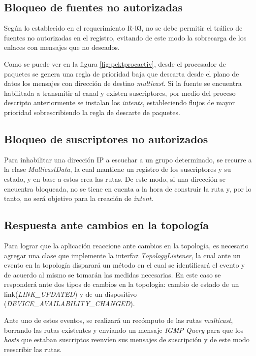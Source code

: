 \subsection{Bloqueo de fuentes no autorizadas}

Según lo establecido en el requerimiento R-03, no se debe permitir el tráfico de fuentes no autorizadas en el registro, evitando de este modo la sobrecarga de los enlaces con mensajes que no deseados. \

Como se puede ver en la figura \ref{fig:pcktprocactiv}, desde el procesador de paquetes se genera una regla de prioridad baja que descarta desde el plano de datos los mensajes con dirección de destino \textit{multicast}. Si la fuente se encuentra habilitada a transmitir al canal y existen suscriptores, por medio del proceso descripto anteriormente se instalan los \textit{intents}, estableciendo flujos de mayor prioridad sobrescribiendo la regla de descarte de paquetes. \

\subsection{Bloqueo de suscriptores no autorizados}

Para inhabilitar una dirección IP a escuchar a un grupo determinado, se recurre a la clase \textit{MulticastData}, la cual mantiene un registro de los suscriptores y su estado, y en base a estos crea las rutas. De este modo, si una dirección se encuentra bloqueada, no se tiene en cuenta a la hora de construir la ruta y, por lo tanto, no será objetivo para la creación de \textit{intent}.

\subsection{Respuesta ante cambios en la topología}

Para lograr que la aplicación reaccione ante cambios en la topología, es necesario agregar una clase que implemente la interfaz \textit{TopologyListener}, la cual ante un evento en la topología disparará un método en el cual se identificará el evento y de acuerdo al mismo se tomarán las medidas necesarias. En este caso se responderá ante dos tipos de cambios en la topología: cambio de estado de un link(\textit{LINK\_UPDATED}) y de un dispositivo (\textit{DEVICE\_AVAILABILITY\_CHANGED}). \

Ante uno de estos eventos, se realizará un recómputo de las rutas \textit{multicast}, borrando las rutas existentes y enviando un mensaje \textit{IGMP Query} para que los \textit{hosts} que estaban suscriptos reenvíen sus mensajes de suscripción y de este modo reescribir las rutas.


